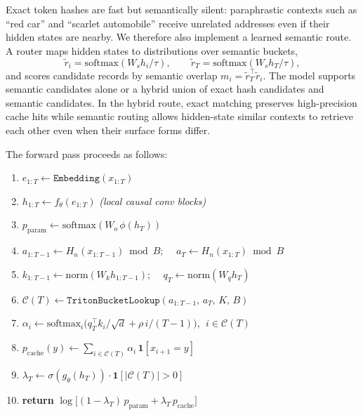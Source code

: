 \documentclass{article}
\begin{document}
Exact token hashes are fast but semantically silent: paraphrastic contexts such
as ``red car'' and ``scarlet automobile'' receive unrelated addresses even if
their hidden states are nearby. We therefore also implement a learned semantic
route. A router maps hidden states to distributions over semantic buckets,
\begin{equation}
  \tilde{r}_i = \mathrm{softmax}(W_s h_i / \tau), \qquad
  \tilde{r}_T = \mathrm{softmax}(W_s h_T / \tau),
\end{equation}
and scores candidate records by semantic overlap
$m_i = \tilde{r}_T^\top \tilde{r}_i$. The model supports semantic candidates
alone or a hybrid union of exact hash candidates and semantic candidates. In the
hybrid route, exact matching preserves high-precision cache hits while semantic
routing allows hidden-state similar contexts to retrieve each other even when
their surface forms differ.

\noindent\begin{minipage}{\linewidth}
The forward pass proceeds as follows:
\begin{enumerate}
  \item $e_{1:T} \leftarrow \texttt{Embedding}(x_{1:T})$
  \item $h_{1:T} \leftarrow f_\theta(e_{1:T})$ \hfill\textit{(local causal conv blocks)}
  \item $p_{\mathrm{param}} \leftarrow \mathrm{softmax}(W_o\,\phi(h_T))$
  \item $a_{1:T-1} \leftarrow H_n(x_{1:T-1}) \bmod B$; $\quad a_T \leftarrow H_n(x_{1:T}) \bmod B$
  \item $k_{1:T-1} \leftarrow \mathrm{norm}(W_k h_{1:T-1})$; $\quad q_T \leftarrow \mathrm{norm}(W_q h_T)$
  \item $\mathcal{C}(T) \leftarrow \texttt{TritonBucketLookup}(a_{1:T-1},\,a_T,\,K,\,B)$
  \item $\alpha_i \leftarrow \mathrm{softmax}_i\!\bigl(q_T^\top k_i / {\sqrt{d}} + \rho\,i/(T{-}1)\bigr)$, $\;i\in\mathcal{C}(T)$
  \item $p_{\mathrm{cache}}(y) \leftarrow \sum_{i \in \mathcal{C}(T)} \alpha_i\,\mathbf{1}[x_{i+1}=y]$
  \item $\lambda_T \leftarrow \sigma(g_\theta(h_T))\cdot\mathbf{1}[\lvert\mathcal{C}(T)\rvert>0]$
  \item \textbf{return} $\log\!\bigl[(1-\lambda_T)\,p_{\mathrm{param}} + \lambda_T\,p_{\mathrm{cache}}\bigr]$
\end{enumerate}
\end{minipage}
\end{document}
